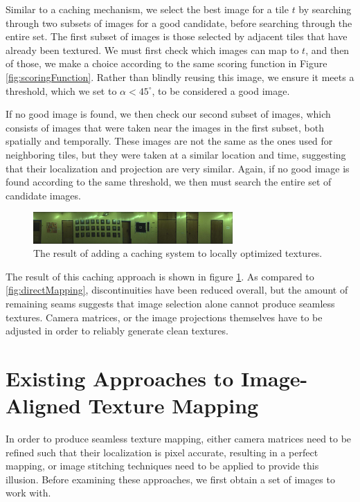 \documentclass[10pt,twocolumn,letterpaper]{article}
\begin{document}
Similar to a caching mechanism, we select the best image for a tile
$t$ by searching through two subsets of images for a good candidate,
before searching through the entire set. The first subset of images is
those selected by adjacent tiles that have already been textured. We
must first check which images can map to $t$, and then of those, we
make a choice according to the same scoring function in Figure
\ref{fig:scoringFunction}. Rather than blindly reusing this image, we
ensure it meets a threshold, which we set to $\alpha < 45^\circ$, to
be considered a good image.

If no good image is found, we then check our second subset of images,
which consists of images that were taken near the images in the first
subset, both spatially and temporally. These images are not the same
as the ones used for neighboring tiles, but they were taken at a
similar location and time, suggesting that their localization and
projection are very similar. Again, if no good image is found
according to the same threshold, we then must search the entire set of
candidate images.

\begin{figure}
  \centering
  \includegraphics[width=3in]{wall1_cache_full.jpg}
  \caption{The result of adding a caching system to locally optimized
    textures.}
  \label{fig:caching}
\end{figure}


The result of this caching approach is shown in figure
\ref{fig:caching}. As compared to \ref{fig:directMapping},
discontinuities have been reduced overall, but the amount of remaining
seams suggests that image selection alone cannot produce seamless
textures. Camera matrices, or the image projections themselves have to
be adjusted in order to reliably generate clean textures.

\section{Existing Approaches to Image-Aligned Texture Mapping}
\label{sec:existingApproaches}
In order to produce seamless texture mapping, either camera matrices
need to be refined such that their localization is pixel accurate,
resulting in a perfect mapping, or image stitching techniques need to
be applied to provide this illusion. Before examining these
approaches, we first obtain a set of images to work with.
\end{document}
